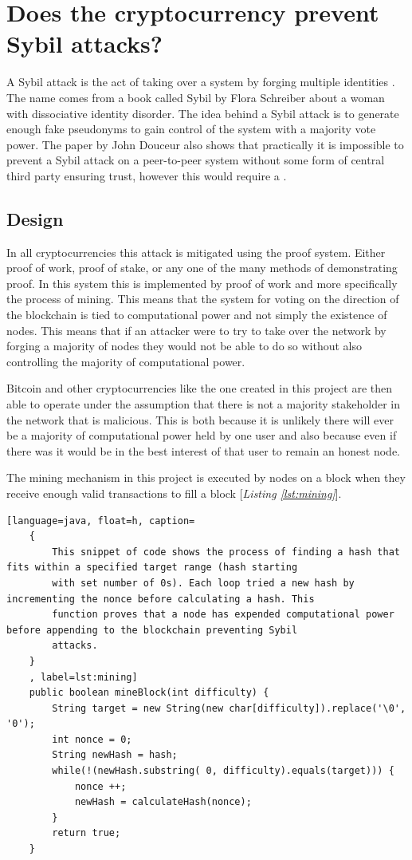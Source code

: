 \documentclass{l4proj}
\begin{document}
\section{Does the cryptocurrency prevent Sybil attacks?}
A Sybil attack is the act of taking over a system by forging multiple identities \citep{douceur2002sybil}. The name comes from a book
called Sybil by Flora Schreiber \citep{schreiber1973sybil} about a woman with dissociative identity disorder. The idea behind a Sybil attack is to 
generate enough fake pseudonyms to gain control of the system with a majority vote power. The paper by John Douceur 
also shows that practically it is impossible to prevent a Sybil attack on a peer-to-peer system \citep{douceur2002sybil} without some
form of central third party ensuring trust, however this would require a .

\subsection{Design}
In all cryptocurrencies this attack is mitigated using the proof system. Either proof of work, proof of stake, or any one
of the many methods of demonstrating proof. In this system this is implemented by proof of work and more specifically
the process of mining. This means that the system for voting on the direction of the blockchain is tied to computational 
power and not simply the existence of nodes. This means that if an attacker were to try to take over the network by 
forging a majority of nodes they would not be able to do so without also controlling the majority of computational power.

Bitcoin and other cryptocurrencies like the one created in this project are then able to operate under the assumption
that there is not a majority stakeholder in the network that is malicious. This is both because it is unlikely there will
ever be a majority of computational power held by one user and also because even if there was it would be in the best 
interest of that user to remain an honest node.

The mining mechanism in this project is executed by nodes on a block when they receive enough valid transactions to
fill a block [\textit{Listing \ref{lst:mining}}].

\begin{lstlisting}[language=java, float=h, caption=
    {
        This snippet of code shows the process of finding a hash that fits within a specified target range (hash starting
        with set number of 0s). Each loop tried a new hash by incrementing the nonce before calculating a hash. This 
        function proves that a node has expended computational power before appending to the blockchain preventing Sybil
        attacks.
    }
    , label=lst:mining]
    public boolean mineBlock(int difficulty) {
        String target = new String(new char[difficulty]).replace('\0', '0');
        int nonce = 0; 
        String newHash = hash;
		while(!(newHash.substring( 0, difficulty).equals(target))) {
            nonce ++;
			newHash = calculateHash(nonce);
        }
        return true;
    }
\end{lstlisting}
\end{document}
